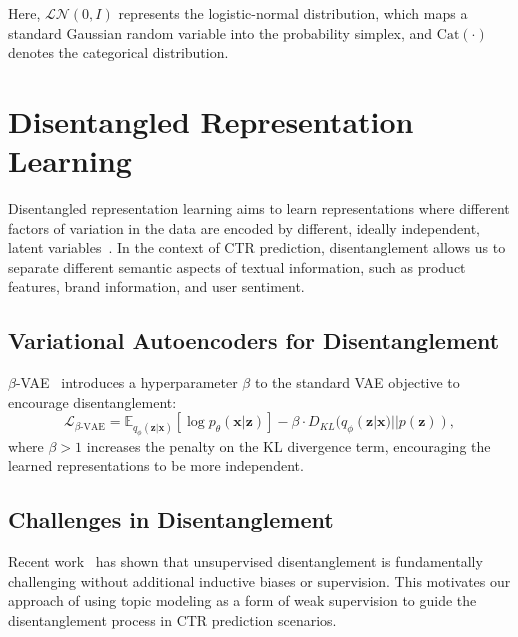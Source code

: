 Here, $\mathcal{LN}(0, I)$ represents the logistic-normal distribution, which maps a standard Gaussian random variable into the probability simplex, and $\text{Cat}(\cdot)$ denotes the categorical distribution.

\section{Disentangled Representation Learning}

Disentangled representation learning aims to learn representations where different factors of variation in the data are encoded by different, ideally independent, latent variables~\cite{higgins2017beta}. In the context of CTR prediction, disentanglement allows us to separate different semantic aspects of textual information, such as product features, brand information, and user sentiment.

\subsection{Variational Autoencoders for Disentanglement}

$\beta$-VAE~\cite{higgins2017beta} introduces a hyperparameter $\beta$ to the standard VAE objective to encourage disentanglement:
\[
\mathcal{L}_{\beta\text{-VAE}} = \mathbb{E}_{q_\phi(\mathbf{z}|\mathbf{x})}[\log p_\theta(\mathbf{x}|\mathbf{z})] - \beta \cdot D_{KL}(q_\phi(\mathbf{z}|\mathbf{x}) || p(\mathbf{z})),
\]
where $\beta > 1$ increases the penalty on the KL divergence term, encouraging the learned representations to be more independent.

\subsection{Challenges in Disentanglement}

Recent work~\cite{locatello2019challenging} has shown that unsupervised disentanglement is fundamentally challenging without additional inductive biases or supervision. This motivates our approach of using topic modeling as a form of weak supervision to guide the disentanglement process in CTR prediction scenarios.